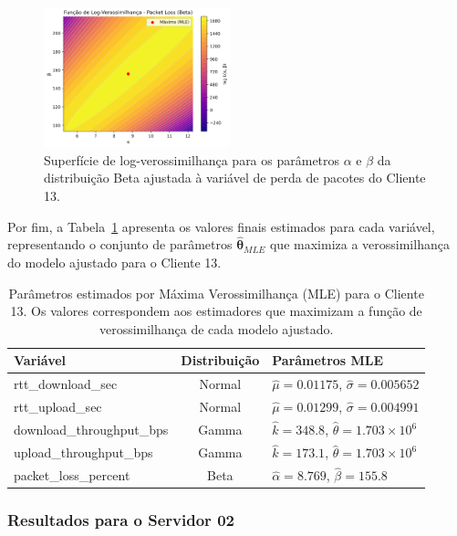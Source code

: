 \documentclass{article}
\begin{document}
\begin{figure}[htp]
	\centering
	\includegraphics[width=0.48\textwidth]{../figures/mle/packet_loss_loglik_surface_beta_client13.png}
	\caption{Superfície de log-verossimilhança para os parâmetros $\alpha$ e $\beta$ da distribuição Beta ajustada à variável de perda de pacotes do Cliente 13.}
	\label{fig:packet_loss_loglik_surface_beta_client13}
\end{figure}

Por fim, a Tabela~\ref{tab:mle_parameters_client13} apresenta os valores finais estimados para cada variável,
representando o conjunto de parâmetros $\hat{\boldsymbol{\theta}}_{MLE}$ que maximiza a verossimilhança
do modelo ajustado para o Cliente 13.

\begin{table}[htp]
	\centering
	\caption{Parâmetros estimados por Máxima Verossimilhança (MLE) para o Cliente 13. Os valores correspondem aos estimadores que maximizam a função de verossimilhança de cada modelo ajustado.}
	\label{tab:mle_parameters_client13}
	\begin{tabular}{|l|c|l|}
		\hline
		\textbf{Variável} & \textbf{Distribuição} & \textbf{Parâmetros MLE}\\
		\hline
		rtt\_download\_sec & Normal & $\hat{\mu}=0.01175$, $\hat{\sigma}=0.005652$\\
		\hline
		rtt\_upload\_sec & Normal & $\hat{\mu}=0.01299$, $\hat{\sigma}=0.004991$\\
		\hline
		download\_throughput\_bps & Gamma & $\hat{k}=348.8$, $\hat{\theta}=1.703 \times 10^6$ \\
		\hline
		upload\_throughput\_bps & Gamma & $\hat{k}=173.1$, $\hat{\theta}=1.703 \times 10^6$ \\
		\hline
		packet\_loss\_percent & Beta & $\hat{\alpha}=8.769$, $\hat{\beta}=155.8$ \\
		\hline
	\end{tabular}
\end{table}

\subsubsection*{Resultados para o Servidor 02}
\end{document}
